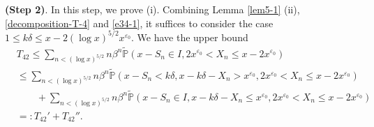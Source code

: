 \documentclass[11pt]{article}
\numberwithin{equation}{section}
\begin{document}
\noindent
{\bf(Step 2)}. In this step, we prove (i). Combining Lemma \ref{lem5-1} (ii), \eqref{decomposition-T-4} and  \eqref{e34-1}, it suffices to consider the case $1\leq k\delta \leq x- 2(\log x)^{5/2} x^{\varepsilon_0}$.
We have the upper bound 
\begin{align}\label{decomposition-T-42}
	&T_{42}\leq \sum_{n< (\log x)^{5/2}}  n\beta^{n}\widetilde{\mathbb{P}}\left( x-S_n\in I,      2x^{\varepsilon_0}< X_n \leq x-2x^{\varepsilon_0}\right) \nonumber\\
	&\leq \sum_{n< (\log x)^{5/2}}  n\beta^{n}\widetilde{\mathbb{P}}\left( x-S_n<k\delta,    x-k\delta-X_n>x^{\varepsilon_0},   2x^{\varepsilon_0}< X_n \leq x-2x^{\varepsilon_0}\right) \nonumber\\
	&\qquad + \sum_{n< (\log x)^{5/2}}  n\beta^{n}\widetilde{\mathbb{P}}\left( x-S_n\in I,    x-k\delta-X_n\leq x^{\varepsilon_0},   2x^{\varepsilon_0}< X_n \leq x-2x^{\varepsilon_0}\right) \nonumber\\
	&=: T_{42}' + T_{42}''. 
\end{align}
\end{document}

